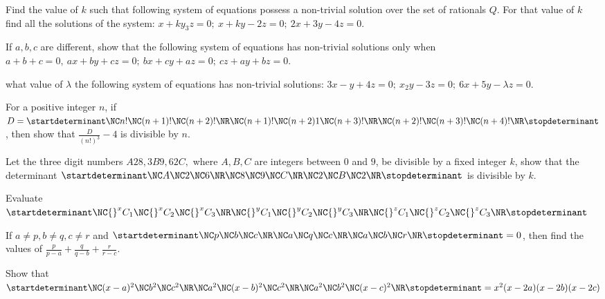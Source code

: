 \item Find the value of $k$ such that following system of equations possess a non-trivial solution over the set of rationals
  $Q$. For that value of $k$ find all the solutions of the system: $x + ky _ 3z = 0;\ x + ky - 2z = 0;\ 2x + 3y - 4z = 0$.
\item If $a, b, c$ are different, show that the following system of equations has non-trivial solutions only when $a + b + c =
  0,\ ax + by + cz = 0;\ bx + cy + az = 0;\ cz + ay + bz = 0$.
\item  what value of $\lambda$ the following system of equations has non-trivial solutions: $3x - y + 4z = 0;\ x _ 2y - 3z = 0;\ 6x
  + 5y - \lambda z = 0$.
\item For a positive integer $n$, if $D = \startdeterminant\NC  n! \NC (n + 1)! \NC (n + 2)!\NR\NC (n + 1)! \NC (n + 2)1 \NC (n + 3)! \NR\NC (n + 2)! \NC (n +
  3)! \NC (n + 4)!\NR\stopdeterminant$, then show that $\frac{D}{(n!)^3} - 4$ is divisible by $n$.
\item Let the three digit numbers $A28, 3B9, 62C,$ where $A, B, C$ are integers between $0$ and $9$, be divisible by a fixed
  integer $k$, show that the determinant $\startdeterminant\NC  A \NC 2 \NC 6\NR\NC  8 \NC 9 \NC C \NR\NC  2 \NC B\NC 2\NR\stopdeterminant$ is divisible by $k$.
\item Evaluate $\startdeterminant\NC {}^xC_1 \NC {}^xC_2 \NC {}^xC_3\NR\NC {}^yC_1 \NC {}^yC_2 \NC {}^yC_3\NR\NC {}^zC_1 \NC {}^zC_2 \NC {}^zC_3\NR\stopdeterminant$
\item If $a\neq p, b\neq q, c\neq r$ and $\startdeterminant\NC  p \NC b \NC c\NR\NC a \NC q \NC c\NR\NC a \NC b \NC r\NR\stopdeterminant = 0$, then find the values of
  $\frac{p}{p - a} + \frac{q}{q - b} + \frac{r}{r - c}$.
\item Show that $\startdeterminant\NC (x - a)^2 \NC b^2 \NC c^2 \NR\NC a^2 \NC (x - b)^2 \NC c^2\NR\NC a^2 \NC b^2 \NC (x - c)^2\NR\stopdeterminant = x^2(x - 2a)(x -
  2b)(x - 2c)$

